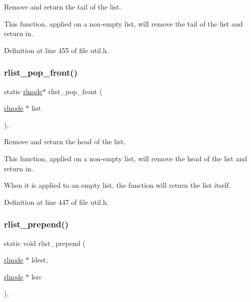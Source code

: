 Remove and return the tail of the list. 

This function, applied on a non-\/empty list, will remove the tail of the list and return in. 

Definition at line 455 of file util.\+h.

\mbox{\label{group__rlists_ga5cc2be48f94a7573fb8952356c6ba7d1}} 
\subsubsection{\texorpdfstring{rlist\+\_\+pop\+\_\+front()}{rlist\_pop\_front()}}
{\footnotesize\ttfamily static \hyperlink{group__rlists_ga8f6244877f7ce2322c90525217ea6e7a}{rlnode}$\ast$ rlist\+\_\+pop\+\_\+front (\begin{DoxyParamCaption}\item[{\hyperlink{group__rlists_ga8f6244877f7ce2322c90525217ea6e7a}{rlnode} $\ast$}]{list }\end{DoxyParamCaption})\hspace{0.3cm}{\ttfamily [inline]}, {\ttfamily [static]}}



Remove and return the head of the list. 

This function, applied on a non-\/empty list, will remove the head of the list and return in.

When it is applied to an empty list, the function will return the list itself. 

Definition at line 447 of file util.\+h.

\mbox{\label{group__rlists_ga906dea2f5a25116f979ba6585266453e}} 
\subsubsection{\texorpdfstring{rlist\+\_\+prepend()}{rlist\_prepend()}}
{\footnotesize\ttfamily static void rlist\+\_\+prepend (\begin{DoxyParamCaption}\item[{\hyperlink{group__rlists_ga8f6244877f7ce2322c90525217ea6e7a}{rlnode} $\ast$}]{ldest,  }\item[{\hyperlink{group__rlists_ga8f6244877f7ce2322c90525217ea6e7a}{rlnode} $\ast$}]{lsrc }\end{DoxyParamCaption})\hspace{0.3cm}{\ttfamily [inline]}, {\ttfamily [static]}}




